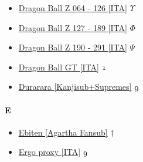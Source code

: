 \begin{itemize}
				\item \href{https://mega.nz/#F!g6QkTKJT!j4yX-4wubW82ltW1C9a-0w} {Dragon Ball Z 064 - 126 [ITA]}  $\varUpsilon$ \\ 
				\item \href{https://mega.nz/#F!86gFCBpR!tXm7GYBc37LnZkgkh-RMTw} {Dragon Ball Z 127 - 189 [ITA]}  $\varPhi$ \\ 
				\item \href{https://mega.nz/#F!1epmmKrC!QuAw91jKppK7Ahvj4runJg} {Dragon Ball Z 190 - 291  [ITA]}  $\varPsi$ \\ 
				\item \href{https://mega.nz/#F!7eYz2SwK!WvEHijL0Se-4vpFXt3FoCQ} {Dragon Ball GT [ITA]}  $\oldstylenums{1}$ \\ 
				\item \href{https://mega.nz/#F!KHIDRIhD!UlN6OVA4OYLole8XYQJq8w} {Durarara [Kanjisub+Supremes]}  $\oldstylenums{9}$ \\ 
			
			\end{itemize}
		
		\paragraph{E} \hypertarget{SE}{}
			\begin{itemize}
				
				\item \href{https://mega.nz/#F!aPRBnYST!UM5QjTRcreCP4_x1leEC5g} {Ebiten [Agartha Fansub]}  $\dag$ \\ 
				\item \href{https://mega.nz/#F!DTBzDIwZ!IifIBsxqePXia4f8OHhDqQ} {Ergo proxy [ITA]}  $\oldstylenums{9}$ \\ 
				
			\end{itemize}
			
